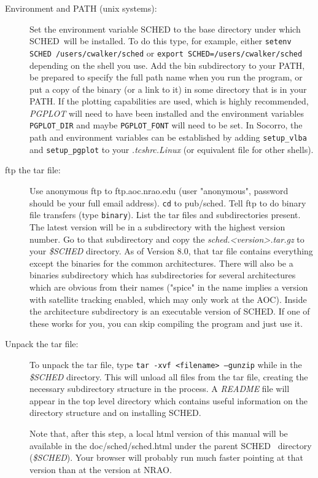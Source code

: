 \documentclass{report}
\newcommand{\sched}{{\sc SCHED}}
\newcommand{\schedb}{{\sc SCHED~}}
\begin{document}
\begin{description}

\item [Environment and PATH (unix systems):] Set the environment
variable SCHED to the base directory under which \schedb will be
installed.  To do this type, for example, either {\tt setenv SCHED 
/users/cwalker/sched} or {\tt export SCHED=/users/cwalker/sched}
depending on the
shell you use.  Add the bin subdirectory to your PATH, be prepared to
specify the full path name when you run the program, or put a copy of
the binary (or a link to it) in some directory that is in your PATH.
If the plotting capabilities are used, which is highly recommended,
{\sl PGPLOT} will need to have been installed and the environment
variables {\tt PGPLOT\_DIR} and maybe {\tt PGPLOT\_FONT} will need to be
set.  In Socorro, the path and environment variables can be
established by adding {\tt setup\_vlba} and {\tt setup\_pgplot} to your
{\sl .tcshrc.Linux} (or equivalent file for other shells).

\item [ftp the tar file:] Use anonymous ftp to ftp.aoc.nrao.edu (user
"anonymous", password should be your full email address).  {\tt cd} to
pub/sched.  Tell ftp to do binary file transfers (type {\tt binary}).
List the tar files and subdirectories present.  The latest version
will be in a subdirectory with the highest version number.  Go to that
subdirectory and copy the {\sl sched.<version>.tar.gz} to your {\sl
\$SCHED} directory.  As of Version 8.0, that tar file contains
everything except the binaries for the common architectures. There
will also be a binaries subdirectory which has subdirectories for
several architectures which are obvious from their names ("spice" in
the name implies a version with satellite tracking enabled, which may
only work at the AOC).  Inside the architecture subdirectory is an
executable version of \sched.  If one of these works for you, you can
skip compiling the program and just use it.

\item [Unpack the tar file:] To unpack the tar file, type {\tt tar
-xvf <filename> --gunzip} while in the {\sl \$SCHED} directory.  This
will unload all files from the tar file, creating the necessary
subdirectory structure in the process.  A {\sl README} file will
appear in the top level directory which contains useful information on
the directory structure and on installing \sched.

Note that, after this step, a local html version of this manual will
be available in the doc/sched/sched.html under the parent \schedb
directory ({\sl \$SCHED}).  Your browser will probably run much faster
pointing at that version than at the version at NRAO.


\end{description}
\end{document}
